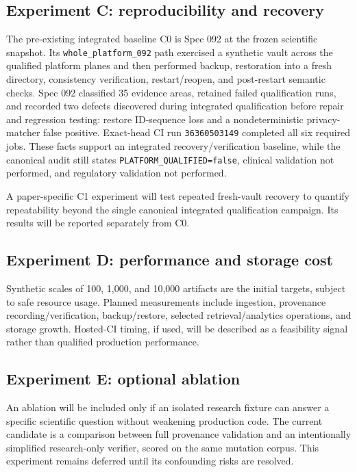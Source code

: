 \subsection{Experiment C: reproducibility and recovery}
The pre-existing integrated baseline C0 is Spec 092 at the frozen scientific snapshot. Its \texttt{whole\_platform\_092} path exercised a synthetic vault across the qualified platform planes and then performed backup, restoration into a fresh directory, consistency verification, restart/reopen, and post-restart semantic checks. Spec 092 classified 35 evidence areas, retained failed qualification runs, and recorded two defects discovered during integrated qualification before repair and regression testing: restore ID-sequence loss and a nondeterministic privacy-matcher false positive. Exact-head CI run \texttt{36360503149} completed all six required jobs. These facts support an integrated recovery/verification baseline, while the canonical audit still states \texttt{PLATFORM\_QUALIFIED=false}, clinical validation not performed, and regulatory validation not performed.

A paper-specific C1 experiment will test repeated fresh-vault recovery to quantify repeatability beyond the single canonical integrated qualification campaign. Its results will be reported separately from C0.

\subsection{Experiment D: performance and storage cost}
Synthetic scales of 100, 1,000, and 10,000 artifacts are the initial targets, subject to safe resource usage. Planned measurements include ingestion, provenance recording/verification, backup/restore, selected retrieval/analytics operations, and storage growth. Hosted-CI timing, if used, will be described as a feasibility signal rather than qualified production performance.

\subsection{Experiment E: optional ablation}
An ablation will be included only if an isolated research fixture can answer a specific scientific question without weakening production code. The current candidate is a comparison between full provenance validation and an intentionally simplified research-only verifier, scored on the same mutation corpus. This experiment remains deferred until its confounding risks are resolved.
